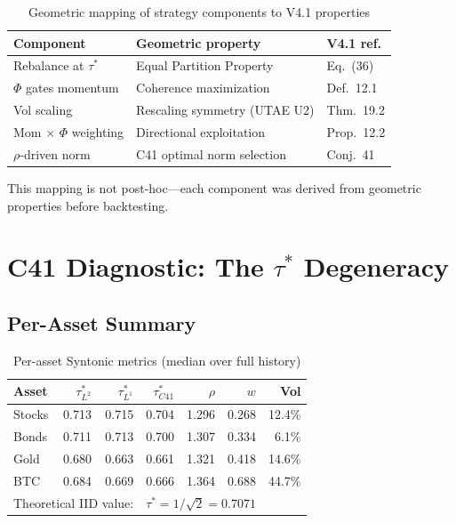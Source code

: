 \documentclass[11pt,a4paper]{article}
\begin{document}
\begin{table}[H]
\centering
\caption{Geometric mapping of strategy components to V4.1 properties}
\label{tab:geometry}
\begin{tabular}{lll}
\toprule
Component & Geometric property & V4.1 ref. \\
\midrule
Rebalance at $\tau^*$ & Equal Partition Property & Eq.~(36) \\
$\Phi$ gates momentum & Coherence maximization & Def.~12.1 \\
Vol scaling & Rescaling symmetry (UTAE U2) & Thm.~19.2 \\
Mom $\times$ $\Phi$ weighting & Directional exploitation & Prop.~12.2 \\
$\rho$-driven norm & C41 optimal norm selection & Conj.~41 \\
\bottomrule
\end{tabular}
\end{table}

This mapping is not post-hoc---each component was derived from geometric properties before backtesting.

\section{C41 Diagnostic: The $\tau^*$ Degeneracy}

\subsection{Per-Asset Summary}

\begin{table}[H]
\centering
\caption{Per-asset Syntonic metrics (median over full history)}
\label{tab:c41diag}
\begin{tabular}{lrrrrrr}
\toprule
Asset & $\tau^*_{L^2}$ & $\tau^*_{L^1}$ & $\tau^*_{C41}$ & $\rho$ & $w$ & Vol \\
\midrule
Stocks & 0.713 & 0.715 & 0.704 & 1.296 & 0.268 & 12.4\% \\
Bonds  & 0.711 & 0.713 & 0.700 & 1.307 & 0.334 &  6.1\% \\
Gold   & 0.680 & 0.663 & 0.661 & 1.321 & 0.418 & 14.6\% \\
BTC    & 0.684 & 0.669 & 0.666 & 1.364 & 0.688 & 44.7\% \\
\midrule
\multicolumn{3}{l}{Theoretical IID value:} & \multicolumn{4}{l}{$\tau^* = 1/\sqrt{2} = 0.7071$} \\
\bottomrule
\end{tabular}
\end{table}
\end{document}
